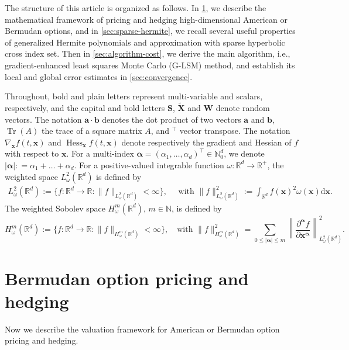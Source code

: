 \documentclass[10pt,a4paper]{amsart}
\numberwithin{equation}{section}
\numberwithin{algorithm}{section}
\theoremstyle{plain}
\theoremstyle{remark}
\newcommand{\R}{\mathbb{R}}
\renewcommand{\Tilde}[1]{\widetilde{#1}}
\begin{document}
The structure of this article is organized as follows. In \cref{sec:pricing-hedging}, we describe the mathematical framework of pricing and hedging high-dimensional American or Bermudan options, and in \cref{sec:sparse-hermite}, we recall several useful properties of generalized Hermite polynomials and approximation with sparse hyperbolic cross index set. Then in \cref{sec:algorithm-cost}, we derive the main algorithm, i.e., gradient-enhanced least squares Monte Carlo (G-LSM) method, and establish its local and global error estimates in \cref{sec:convergence}.

Throughout, bold and plain letters represent multi-variable and scalars, respectively, and the capital and bold letters $\mathbf{S}$, $\Tilde{\mathbf{X}}$ and $\mathbf{W}$ denote random vectors. The notation $\mathbf{a} \cdot \mathbf{b}$ denotes the dot product of two vectors $\mathbf{a}$ and $\mathbf{b}$, $\operatorname{Tr}(A)$ the trace of a square matrix $A$, and $^\top$ vector transpose. The notation
$\nabla_\mathbf{x}f(t, \mathbf{x})$ and  $\operatorname{Hess}_{\mathbf{x}}f(t,\mathbf{x})$ denote respectively the gradient and Hessian of $f$ with respect to  $\mathbf{x}$. For a multi-index $\bm{\alpha} = (\alpha_1,\ldots,\alpha_d)^\top \in \mathbb{N}_0^d$, we denote $|\bm{\alpha}|: = \alpha_1 + \dots + \alpha_d$. For a positive-valued integrable function $\omega: \mathbb{R}^d\to \mathbb{R}^+$, the weighted space $L^2_{\omega}(\mathbb{R}^d)$ is defined by
\begin{align*}
L^2_{\omega}(\mathbb{R}^d):=\{f:\mathbb{R}^d\to \mathbb{R}: \|f\|_{L^2_{\omega}(\mathbb{R}^d)}<\infty\},\quad \text{ with }  \|f\|_{L^2_{\omega}(\mathbb{R}^d)}^2:=\int_{\mathbb{R}^d}f(\mathbf{x})^2\omega(\mathbf{x})\mathrm{d}\mathbf{x}.
\end{align*}
The weighted Sobolev space $H_{\omega}^m(\mathbb{R}^d)$, $m\in \mathbb{N}$, is defined by
$$
H_{\omega}^m(\mathbb{R}^d) := \{f: \R^d \to \R: \|f\|_{H_\omega^m(\R^d)} < \infty\}, \quad \text{with } \|f\|_{H_\omega^m(\R^d)}^2 = \sum_{0\le |\bm{\alpha}|\le m} \left\|\frac{\partial^{\bm{\alpha}} f}{\partial \mathbf{x}^{\bm{\alpha}}}\right\|_{L^2_\omega(\R^d)}^2.
$$
\section{Bermudan option pricing and hedging} \label{sec:pricing-hedging}
Now we describe the valuation framework for American or Bermudan option pricing and hedging.
\end{document}
